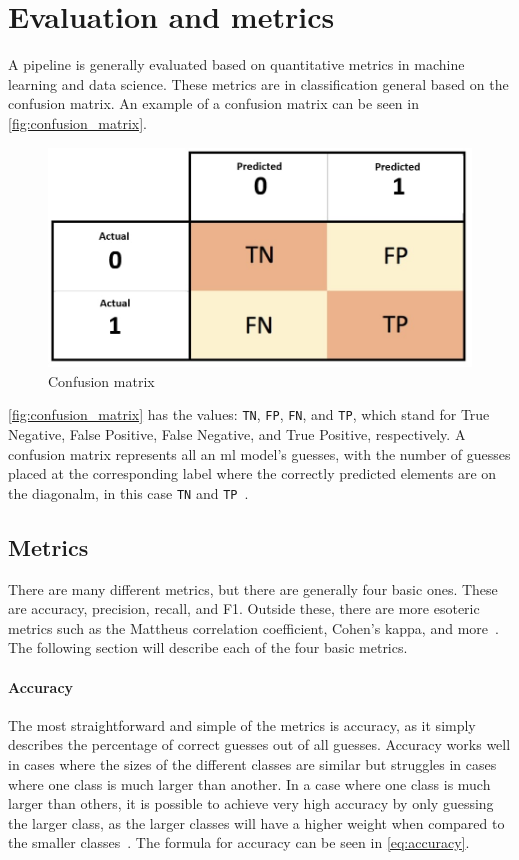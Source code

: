 \section{Evaluation and metrics}\label{sec:evalueation}
A pipeline is generally evaluated based on quantitative metrics in machine learning and data science. These metrics are in classification general based on the confusion matrix. An example of a confusion matrix can be seen in \autoref{fig:confusion_matrix}.

\begin{figure}[htb!]
    \centering
    \includegraphics[scale=0.3]{figures/Confusion_Matrix.jpg}
    \caption{Confusion matrix}
    \label{fig:confusion_matrix}
\end{figure}

\autoref{fig:confusion_matrix} has the values: \texttt{TN}, \texttt{FP}, \texttt{FN}, and \texttt{TP}, which stand for True Negative, False Positive, False Negative, and True Positive, respectively.
A confusion matrix represents all an \gls{ml} model's guesses, with the number of guesses placed at the corresponding label where the correctly predicted elements are on the diagonalm, in this case \texttt{TN} and \texttt{TP}~\cite{james-statistical-learning}.

\subsection{Metrics}\label{subsec:metrics}
There are many different metrics, but there are generally four basic ones. These are accuracy, precision, recall, and F1. Outside these, there are more esoteric metrics such as the Mattheus correlation coefficient, Cohen's kappa, and more~\cite{metrics-for-multi}. The following section will describe each of the four basic metrics.

\paragraph{Accuracy} The most straightforward and simple of the metrics is accuracy, as it simply describes the percentage of correct guesses out of all guesses. Accuracy works well in cases where the sizes of the different classes are similar but struggles in cases where one class is much larger than another. In a case where one class is much larger than others, it is possible to achieve very high accuracy by only guessing the larger class, as the larger classes will have a higher weight when compared to the smaller classes~\cite{metrics-for-multi}. The formula for accuracy can be seen in \ref{eq:accuracy}.

